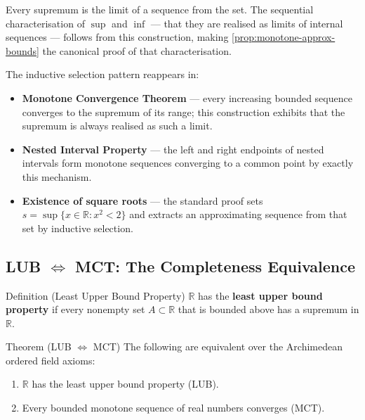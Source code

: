 \begin{remark}[Consequence]
Every supremum is the limit of a sequence from the set. The sequential
characterisation of $\sup$ and $\inf$ --- that they are realised as limits
of internal sequences --- follows from this construction, making
\cref{prop:monotone-approx-bounds} the canonical proof of that
characterisation.
\end{remark}

\begin{remark}
The inductive selection pattern reappears in:
\begin{itemize}
  \item \textbf{Monotone Convergence Theorem} --- every increasing bounded
        sequence converges to the supremum of its range; this construction
        exhibits that the supremum is always realised as such a limit.
  \item \textbf{Nested Interval Property} --- the left and right endpoints
        of nested intervals form monotone sequences converging to a common
        point by exactly this mechanism.
  \item \textbf{Existence of square roots} --- the standard proof sets
        $s=\sup\{x\in\mathbb{R}:x^2<2\}$ and extracts an approximating
        sequence from that set by inductive selection.
\end{itemize}
\end{remark}

\subsection*{\texorpdfstring{LUB $\Longleftrightarrow$ MCT: The Completeness Equivalence}{LUB Longleftrightarrow MCT: The Completeness Equivalence}}
\label{subsec:LUB-MCT}

\begin{definitionbox}{Definition (Least Upper Bound Property)}
\label{def:LUB}
$\mathbb{R}$ has the \textbf{least upper bound property} if every nonempty
set $A\subset\mathbb{R}$ that is bounded above has a supremum in $\mathbb{R}$.
\end{definitionbox}

\begin{theorembox}{Theorem (LUB $\Longleftrightarrow$ MCT)}
\label{thm:LUB-iff-MCT}
The following are equivalent over the Archimedean ordered field axioms:
\begin{enumerate}[label=(\roman*)]
  \item $\mathbb{R}$ has the least upper bound property (LUB).
  \item Every bounded monotone sequence of real numbers converges (MCT).
\end{enumerate}
\end{theorembox}


